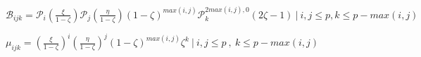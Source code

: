 \documentclass{article}
\begin{document}
$ \mathcal B_{ijk} = \mathcal P_i \left(\frac{\xi }{1-\zeta}\right) \mathcal P_j \left(\frac{\eta}{1-\zeta}\right) \left(1-\zeta\right)^{max(i,j)} \mathcal P^{2 max(i,j),0}_k \left(2 \zeta -1\right)~|~i,j \leq p, k \leq p - max(i,j) $
\pagebreak

$ \mu_{ijk} = \left(\frac{\xi }{1-\zeta}\right)^i \left(\frac{\eta}{1-\zeta}\right)^j \left(1-\zeta\right)^{max(i,j)} \zeta^k~|~i,j \leq p~,~k \leq p-max(i,j) $
\pagebreak
\end{document}
